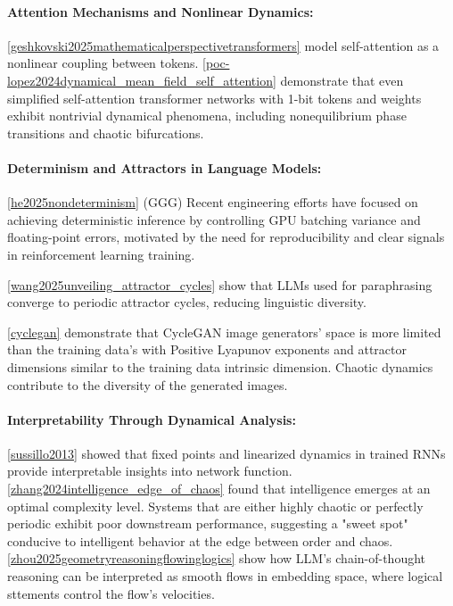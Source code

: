 \documentclass[a4paper,12pt]{article}
\begin{document}
\paragraph{Attention Mechanisms and Nonlinear Dynamics:}
\ref{geshkovski2025mathematicalperspectivetransformers} model self-attention as a nonlinear coupling between tokens.
\ref{poc-lopez2024dynamical_mean_field_self_attention} demonstrate that even simplified self-attention transformer networks with 1-bit tokens and weights exhibit nontrivial dynamical phenomena, including nonequilibrium phase transitions and chaotic bifurcations. 

\paragraph{Determinism and Attractors in Language Models:}
\ref{he2025nondeterminism} (GGG)
Recent engineering efforts have focused on achieving deterministic inference by controlling GPU batching variance and floating-point errors, motivated by the need for reproducibility and clear signals in reinforcement learning training. 

\ref{wang2025unveiling_attractor_cycles} show that LLMs used for paraphrasing converge to periodic attractor cycles, reducing linguistic diversity.

\ref{cyclegan} %
demonstrate that CycleGAN image generators' space is more limited than the training data's with Positive Lyapunov exponents and attractor dimensions similar to the training data intrinsic dimension. Chaotic dynamics contribute to the diversity of the generated images.

\paragraph{Interpretability Through Dynamical Analysis:}
\ref{sussillo2013} showed that fixed points and linearized dynamics in trained RNNs provide interpretable insights into network function. \ref{zhang2024intelligence_edge_of_chaos} found that intelligence emerges at an optimal complexity level. Systems that are either highly chaotic or perfectly periodic exhibit poor downstream performance, suggesting a "sweet spot" conducive to intelligent behavior at the edge between order and chaos. \ref{zhou2025geometryreasoningflowinglogics} show how LLM's chain-of-thought reasoning can be interpreted as smooth flows in embedding space, where logical sttements control the flow's velocities.
\end{document}
